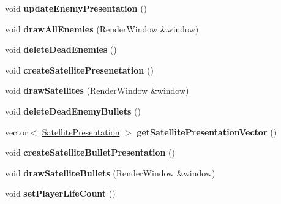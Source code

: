 \begin{DoxyCompactItemize}
\mbox{\label{class_game_presentation_a4ab96a6022c08f34aefa62f9a30c1cd8}} 
void {\bfseries update\+Enemy\+Presentation} ()
\item 
\mbox{\label{class_game_presentation_af29e04c4a89f0a6d1ca9eab33da5ace5}} 
void {\bfseries draw\+All\+Enemies} (Render\+Window \&window)
\item 
\mbox{\label{class_game_presentation_ae83bb9e0751f6077f2480a36dec36787}} 
void {\bfseries delete\+Dead\+Enemies} ()
\item 
\mbox{\label{class_game_presentation_a921823ce61d5c9a0db91098c8f055d28}} 
void {\bfseries create\+Satellite\+Presenetation} ()
\item 
\mbox{\label{class_game_presentation_a7a94467d53b62bd7a83035ea4fa386ac}} 
void {\bfseries draw\+Satellites} (Render\+Window \&window)
\item 
\mbox{\label{class_game_presentation_acc8d59152c26b9dddc84081c5a4483f2}} 
void {\bfseries delete\+Dead\+Enemy\+Bullets} ()
\item 
\mbox{\label{class_game_presentation_a8bb8847556bd4977479df73eec79b2eb}} 
vector$<$ \hyperlink{class_satellite_presentation}{Satellite\+Presentation} $>$ {\bfseries get\+Satellite\+Presentation\+Vector} ()
\item 
\mbox{\label{class_game_presentation_a172770f122258cba73e1dbff88d27ea5}} 
void {\bfseries create\+Satellite\+Bullet\+Presentation} ()
\item 
\mbox{\label{class_game_presentation_a6ee175034a6d067f2755c75c753f07a0}} 
void {\bfseries draw\+Satellite\+Bullets} (Render\+Window \&window)
\item 
\mbox{\label{class_game_presentation_a5a329f0403011b464c26218eeff38606}} 
void {\bfseries set\+Player\+Life\+Count} ()
\item 
\mbox{\label{class_game_presentation_ac20ace0966aacedc817bdafd6eb6f1ba}} 

\end{DoxyCompactItemize}
